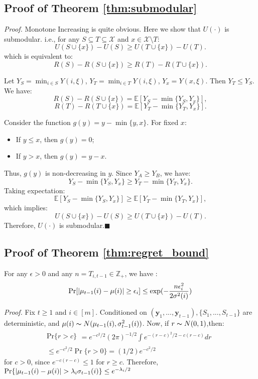 \documentclass[opre,sglanonrev]{informs4}
\begin{document}
\begin{appendices}
\section{Proof of Theorem \ref{thm:submodular}}
\textit{Proof.} Monotone Increasing is quite obvious. Here we show that $U(\cdot)$ is submodular. i.e., for any $S \subseteq T \subseteq \mathcal{X}$ and $x \in \mathcal{X} \setminus T$:
$$
U(S \cup \{x\}) - U(S) \geq U(T \cup \{x\}) - U(T).
$$
which is equivalent to:
$$
R(S)-R(S \cup \{x\}) \geq R(T) - R(T \cup \{x\}).
$$

Let $Y_S = \min_{i \in S} Y(i,\xi)$, $Y_T = \min_{i \in T} Y(i,\xi)$, $Y_x = Y(x,\xi)$. Then $Y_T \leq Y_S$. We have:
\[
R(S) - R(S \cup \{x\}) = \mathbb{E}\left[Y_S - \min\{Y_S, Y_x\}\right],
\]
\[
R(T) - R(T \cup \{x\}) = \mathbb{E}\left[Y_T - \min\{Y_T, Y_x\}\right].
\]

Consider the function $g(y) = y - \min\{y, x\}$. For fixed $x$:
\begin{itemize}
    \item If $y \leq x$, then $g(y) = 0$;
    \item If $y > x$, then $g(y) = y - x$.
\end{itemize}
Thus, $g(y)$ is non-decreasing in $y$. Since $Y_A \geq Y_B$, we have:
\[
Y_S - \min\{Y_S, Y_x\} \geq Y_T - \min\{Y_T, Y_x\}.
\]
Taking expectation:
\[
\mathbb{E}\left[Y_S - \min\{Y_S, Y_x\}\right] \geq \mathbb{E}\left[Y_T - \min\{Y_T, Y_x\}\right],
\]
which implies:
$$
U(S \cup \{x\}) - U(S) \geq U(T \cup \{x\}) - U(T).
$$
Therefore, $U(\cdot)$ is submodular.\hfill $\blacksquare$

\subsection{Proof of Theorem \ref{thm:regret_bound}}
\begin{lemma}
For any $\epsilon > 0$ and any $n = T_{i,t-1} \in \mathbb{Z}_+$, we have :
$$
\textnormal{Pr}[|\mu_{t-1}(i)-\mu(i)|\geq \epsilon_i]\leq \exp(-\frac{n\epsilon_i^2}{2\sigma^2(i)})
$$
\end{lemma} 
\textit{Proof.} Fix $t\geq 1$ and $i\in [m]$. Conditioned on $(\mathbf{y}_1,...,\mathbf{y}_{t-1}), \{S_1,...,S_{t-1}\}$ are deterministic, and $\mu(i)\thicksim N(\mu_{t-1}(i),\sigma_{t-1}^2(i))$. Now, if $r\thicksim N(0,1)$,then: 
$$\begin{gathered}
\mathrm{Pr}\{r>c\}
\begin{aligned}
=e^{-c^2/2}(2\pi)^{-1/2}\int e^{-(r-c)^2/2-c(r-c)}dr
\end{aligned} \\
\leq e^{-c^2/2}\Pr\{r>0\}=(1/2)e^{-c^2/2}
\end{gathered}$$
for $c>0$, since $e^{-c(r-c)}\leq 1$ for $r\geq c$. Therefore, $\textnormal{Pr}\{|\mu_{t-1}(i)-\mu(i)|>\lambda_i \sigma_{t-1}(i)\}\leq e^{-\lambda_i/2}$


\end{appendices}
\end{document}
